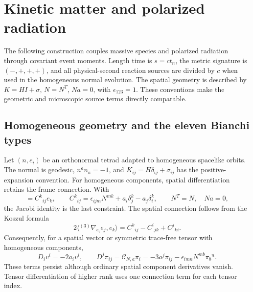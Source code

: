 \chapter{Kinetic matter and polarized radiation}
\label{ii:chapter}

The following construction couples massive species and polarized radiation through covariant event moments. Length time is $s=ct_n$, the metric signature is $(-,+,+,+)$, and all physical-second reaction sources are divided by $c$ when used in the homogeneous normal evolution. The spatial geometry is described by $K=HI+\sigma$, $N=N^T$, $Na=0$, with $\epsilon_{123}=1$. These conventions make the geometric and microscopic source terms directly comparable.


\section{Homogeneous geometry and the eleven Bianchi types}
\label{ii:all_bianchi}
Let $(n,e_i)$ be an orthonormal tetrad adapted to homogeneous spacelike orbits. The normal is geodesic, $n^an_a=-1$, and $K_{ij}=H\delta_{ij}+\sigma_{ij}$ has the positive-expansion convention. For homogeneous components, spatial differentiation retains the frame connection. With
\begin{equation}
 [e_i,e_j]=C^k{}_{ij}e_k,\qquad
 C^k{}_{ij}=\epsilon_{ijm}N^{mk}+a_i\delta^k_j-a_j\delta^k_i,
 \qquad N^T=N,\quad Na=0,
 \label{ii:commutator}
\end{equation}
the Jacobi identity is the last constraint. The spatial connection follows from the Koszul formula
\begin{equation}
 2\langle{}^{(3)}\nabla_{e_i}e_j,e_k\rangle
 =C^k{}_{ij}-C^i{}_{jk}+C^j{}_{ki}.
 \label{ii:spatial_connection}
\end{equation}
Consequently, for a spatial vector or symmetric trace-free tensor with homogeneous components,
\begin{equation}
 D_iv^i=-2a_iv^i,\qquad
 D^j\pi_{ij}=\mathcal C_{N,a}\pi_i
 =-3a^j\pi_{ij}-\epsilon_{imn}N^{mb}\pi_b{}^n.
 \label{ii:connection_divergences}
\end{equation}
These terms persist although ordinary spatial component derivatives vanish. Tensor differentiation of higher rank uses one connection term for each tensor index.

